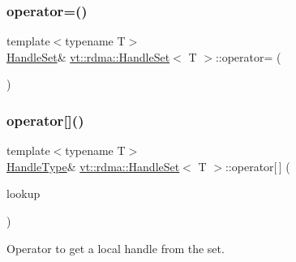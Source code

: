 \mbox{\label{structvt_1_1rdma_1_1_handle_set_afbb15c0776ef7ace101025f2ae151ecd}} 
\subsubsection{\texorpdfstring{operator=()}{operator=()}\hspace{0.1cm}{\footnotesize\ttfamily [2/2]}}
{\footnotesize\ttfamily template$<$typename T$>$ \\
\hyperlink{structvt_1_1rdma_1_1_handle_set}{Handle\+Set}\& \hyperlink{structvt_1_1rdma_1_1_handle_set}{vt\+::rdma\+::\+Handle\+Set}$<$ T $>$\+::operator= (\begin{DoxyParamCaption}\item[{\hyperlink{structvt_1_1rdma_1_1_handle_set}{Handle\+Set}$<$ T $>$ \&\&}]{ }\end{DoxyParamCaption})\hspace{0.3cm}{\ttfamily [default]}}

\mbox{\label{structvt_1_1rdma_1_1_handle_set_ab435257f5fa0f6af282e2775eb41c8c7}} 
\subsubsection{\texorpdfstring{operator[]()}{operator[]()}}
{\footnotesize\ttfamily template$<$typename T$>$ \\
\hyperlink{structvt_1_1rdma_1_1_handle_set_ab3a698ee86bae503dfa84617205b2dd9}{Handle\+Type}\& \hyperlink{structvt_1_1rdma_1_1_handle_set}{vt\+::rdma\+::\+Handle\+Set}$<$ T $>$\+::operator\mbox{[}$\,$\mbox{]} (\begin{DoxyParamCaption}\item[{\hyperlink{structvt_1_1rdma_1_1_handle_set_a81d333ec397f0becb9fe692e53145441}{Lookup\+Type}}]{lookup }\end{DoxyParamCaption})\hspace{0.3cm}{\ttfamily [inline]}}



Operator to get a local handle from the set. 


